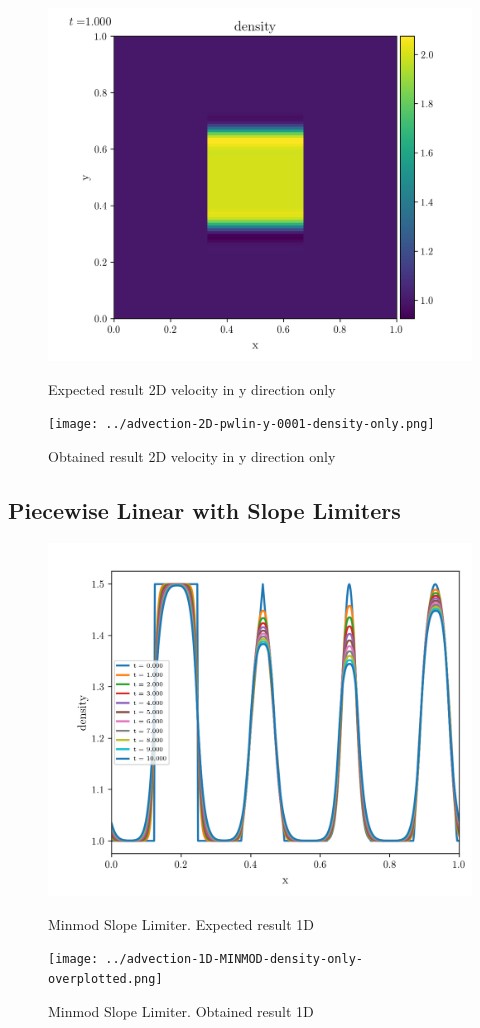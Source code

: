 \begin{figure}[htbp]
    \centering
	\includegraphics[width=.7\textwidth]{./figures/advection-2D-pwlin-y-0001-density-only.png}%
	\caption{Expected result 2D velocity in y direction only}
	\texttt{[image: ../advection-2D-pwlin-y-0001-density-only.png]}%
	\caption{Obtained result 2D velocity in y direction only}
\end{figure}








\clearpage
\subsection{Piecewise Linear with Slope Limiters}

\begin{figure}[htbp]
    \centering
	\includegraphics[width=.7\textwidth]{./figures/advection-1D-MINMOD-density-only-overplotted.png}%
	\caption{Minmod Slope Limiter. Expected result 1D}
	\texttt{[image: ../advection-1D-MINMOD-density-only-overplotted.png]}%
	\caption{Minmod Slope Limiter. Obtained result 1D}
\end{figure}

